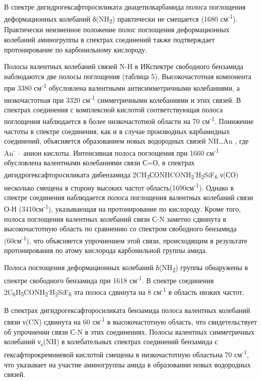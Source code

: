 В спектре дигидрогексафторосиликата диацетилкарбамида полоса поглощения
деформационных колебаний δ(NH\textsubscript{2}) практически не смещается
(1680 см\textsuperscript{-1}). Практически неизменное положение полос
поглощения деформационных колебаний аминогруппы в спектрах соединений
также подтверждает протонирование по карбонильному кислороду.

Полосы валентных колебаний связей N-H в ИКспектре свободного бензамида
наблюдаются две полосы поглощения (таблица 5). Высокочастотная
компонента при 3380 см\textsuperscript{-1} обусловлена валентными
антисимметричными колебаниями, а низкочастотная при 3320
см\textsuperscript{-1} симметричными колебаниями и этих связей. В
спектрах соединения с комплексной кислотой соответствующая полоса
поглощения наблюдается в более низкочастотной области на 70
см\textsuperscript{-1}. Понижение частоты в спектре соединения, как и в
случае производных карбамидных соединений, объясняется образованием
новых водородных связей NH\ldots An , где An\textsuperscript{-} -- анион
кислоты. Интенсивная полоса поглощения при 1660 см\textsuperscript{-1}
обусловлена валентными колебаниями связи С=О, в спектрах
дигидрогексафторосиликата дибензамида
2CH\textsubscript{3}СОNHCONH\textsubscript{2}\textbf{\textsuperscript{.}}H\textsubscript{2}SiF\textsubscript{6}
ν(СО) несколько смещена в сторону высоких частот
область(1690см\textsuperscript{-1}). Однако в спектре соединения
наблюдается полоса поглощения валентных колебаний связи О-Н
(3410см\textsuperscript{-1}), указывающая на протонирование по
кислороду. Кроме того, полоса поглощения валентных колебаний связи С-N
заметно сдвинута в высокочастотную область по сравнению со спектром
свободного бензамида (60см\textsuperscript{-1}), что объясняется
упрочнением этой связи, происходящим в результате протонирования по
атому кислорода карбонильной группы амида.

Полоса поглощения деформационных колебаний δ(NH\textsubscript{2}) группы
обнаружены в спектре свободного бензамида при 1618
см\textsuperscript{-1}. В спектре соединения
2C\textsubscript{6}H\textsubscript{5}CONH\textsubscript{2}\textbf{\textsuperscript{.}}H\textsubscript{2}SiF\textsubscript{6}
эта полоса сдвинута на 8 см\textsuperscript{-1} в область низких частот.

В спектрах дигидрогексафторосиликата бензамида полоса валентных
колебаний связи ν(CN) сдвинута на 60 см\textsuperscript{-1} в
высокочастотную область, что свидетельствует об упрочнении связи С-N в
этих соединениях. Полосы валентных симметричных колебаний
ν\textsubscript{s}(NH) в колебательных спектрах соединений бензамида с
гексафторокремниевой кислотой смещены в низкочастотную областьна 70
см\textsuperscript{-1}, что указывает на участие аминогруппы амида в
образовании новых водородных связей.

